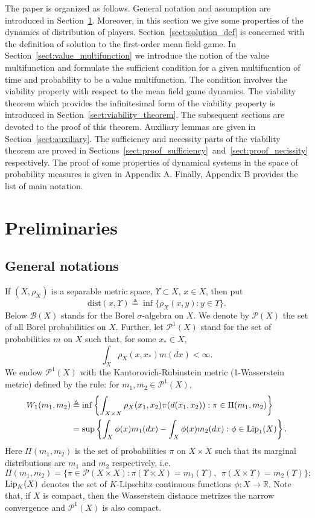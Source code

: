 \documentclass[a4paper,12pt]{article}
\begin{document}
The paper is organized as follows. General notation and assumption are introduced in Section~\ref{sect:preliminaries}. Moreover, in this section we give some properties of the dynamics of distribution of players.  Section~\ref{sect:solution_def} is concerned with the definition of solution to the first-order mean field game. In Section~\ref{sect:value_multifunction} we introduce the notion of the value multifunction and formulate the sufficient condition for a given multifucntion of  time and probability to be a value multifunction. The condition involves the viability property with respect to  the mean field game dynamics. The viability theorem which provides the infinitesimal form of the viability property  is introduced in Section~\ref{sect:viability_theorem}. The subsequent sections are devoted to the proof of this theorem. Auxiliary lemmas are given in Section~\ref{sect:auxiliary}. The sufficiency and necessity parts of the viability theorem are proved in Sections~\ref{sect:proof_sufficiency}~and~\ref{sect:proof_necissity} respectively. The proof of  some properties of  dynamical systems in the space of probability measures %
is given in Appendix A. Finally, Appendix B provides the list of main notation.

\section{Preliminaries}\label{sect:preliminaries}
\subsection{General notations}\label{subsect:notation}
If $(X,\rho_X)$ is a separable metric space, $\Upsilon\subset X$, $x\in X$, then put
$$\mathrm{dist}(x,\Upsilon)\triangleq \inf\{\rho_X(x,y):y\in\Upsilon\}. $$  Below $\mathcal{B}(X)$ stands for the Borel $\sigma$-algebra on $X$. We denote by $\mathcal{P}(X)$ the set of all Borel probabilities on $X$.
Further, let $\mathcal{P}^1(X)$ stand for the set of probabilities $m$ on $X$ such that, for some $x_*\in X$,
$$\int_X\rho_X(x,x_*)m(dx)<\infty. $$ We endow $\mathcal{P}^1(X)$ with the Kantorovich-Rubinstein metric (1-Wasserstein metric) defined by the rule: for $m_1,m_2\in \mathcal{P}^1(X)$,
\begin{equation}\label{intro:wass_distance}
\begin{split}
W_1(m_1,m_2) &\triangleq\inf\left\{\int_{X\times X}\rho_X(x_1,x_2)\pi(d(x_1,x_2)):\pi\in \Pi(m_1,m_2)\right\} \\
&=\sup\left\{\int_X \phi(x) m_1(dx)-\int_X\phi(x)m_2(dx):\phi\in{\rm Lip}_1(X)\right\}.
\end{split}
\end{equation} Here $\Pi(m_1,m_2)$ is the set of probabilities $\pi$ on $X\times X$ such that its marginal distributions are $m_1$ and $m_2$ respectively, i.e.
$$\Pi(m_1,m_2)=\{\pi\in\mathcal{P}(X\times X):\pi(\Upsilon\times X)=m_1(\Upsilon),\ \ \pi(X\times \Upsilon)=m_2(\Upsilon)\}; $$
${\rm Lip}_K(X)$ denotes the set of $K$-Lipschitz continuous functions $\phi:X\rightarrow \mathbb{R}$. Note that, if $X$ is compact, then the Wasserstein distance metrizes the narrow convergence and $\mathcal{P}^1(X)$ is also compact.
\end{document}

